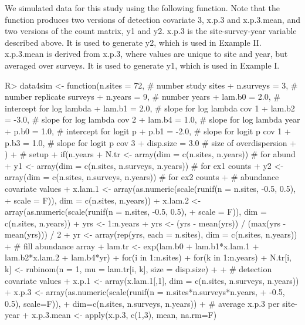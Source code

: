 \documentclass[article]{jss}
\begin{document}
We simulated data for this study using the following function. Note that the function produces two versions of detection covariate 3, x.p.3 and x.p.3.mean, and two versions of the count matrix, y1 and y2. x.p.3 is the site-survey-year variable described above. It is used to generate y2, which is used in Example II. x.p.3.mean is derived from x.p.3, where values are unique to site and year, but averaged over surveys. It is used to generate y1, which is used in Example I.

\begin{Code}
R> data4sim <- function(n.sites = 72,   # number study sites
+                       n.surveys = 3,  # number replicate surveys
+                       n.years = 9,    # number years
+                       lam.b0 = 2.0,   # intercept for log lambda
+                       lam.b1 = 2.0,   # slope for log lambda cov 1
+                       lam.b2 = -3.0,  # slope for log lambda cov 2
+                       lam.b4 = 1.0,   # slope for log lambda year
+                       p.b0 = 1.0,     # intercept for logit p
+                       p.b1 = -2.0,    # slope for logit p cov 1
+                       p.b3 = 1.0,     # slope for logit p cov 3
+                       disp.size = 3.0 # size of overdispersion
+                       ){
+  # setup
+  if(n.years %
+  N.tr <- array(dim = c(n.sites, n.years))           # for abund
+  y1 <- array(dim = c(n.sites, n.surveys, n.years))  # for ex1 counts
+  y2 <- array(dim = c(n.sites, n.surveys, n.years))  # for ex2 counts
+  # abundance covariate values
+  x.lam.1 <- array(as.numeric(scale(runif(n = n.sites, -0.5, 0.5), 
+                   scale = F)), dim = c(n.sites, n.years))
+  x.lam.2 <- array(as.numeric(scale(runif(n = n.sites, -0.5, 0.5), 
+                   scale = F)), dim = c(n.sites, n.years))
+  yrs <- 1:n.years
+  yrs <- (yrs - mean(yrs)) / (max(yrs - mean(yrs))) / 2
+  yr <- array(rep(yrs, each = n.sites), dim = c(n.sites, n.years))
+  # fill abundance array
+  lam.tr <- exp(lam.b0 + lam.b1*x.lam.1 + lam.b2*x.lam.2 + lam.b4*yr)
+  for(i in 1:n.sites){
+    for(k in 1:n.years){
+    N.tr[i, k] <- rnbinom(n = 1, mu = lam.tr[i, k], size = disp.size)
+  }}
+  # detection covariate values
+  x.p.1 <- array(x.lam.1[,1], dim = c(n.sites, n.surveys, n.years))
+  x.p.3 <- array(as.numeric(scale(runif(n = n.sites*n.surveys*n.years, 
+                                        -0.5, 0.5), scale=F)), 
+                 dim=c(n.sites, n.surveys, n.years))
+  # average x.p.3 per site-year
+  x.p.3.mean <- apply(x.p.3, c(1,3), mean, na.rm=F)
}
\end{Code}
\end{document}
